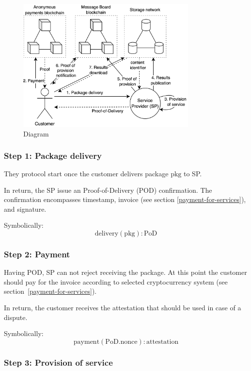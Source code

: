 \documentclass{ieeeaccess}
\begin{document}
\begin{figure}[h!]
\includegraphics[width=9cm]{anonser-diagram.png}
\centering
\caption{Diagram}
\label{fig:diagram}
\end{figure}

\subsubsection{Step 1: Package delivery}\label{step-1-package-delivery}

They protocol start once the customer delivers package \(\mathrm{pkg}\)
to SP.

In return, the SP issue an Proof-of-Delivery (POD) confirmation. The
confirmation encompasses timestamp, invoice (see section \ref{payment-for-services}), and signature.

Symbolically: \[
\mathrm{delivery}(\mathrm{pkg}) : \mathrm{PoD}
\]

\subsubsection{Step 2: Payment}\label{step-2-payment}

Having POD, SP can not reject receiving the package. At this point the
customer should pay for the invoice according to selected cryptocurrency
system (see section~\ref{payment-for-services}).

In return, the customer receives the attestation that should be used in
case of a dispute.

Symbolically: \[
\mathrm{payment}(\mathrm{PoD}.\mathrm{nonce}) : \mathrm{attestation}
\]

\subsubsection{Step 3: Provision of
service}\label{step-3-provision-of-service}
\end{document}
